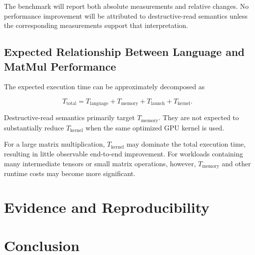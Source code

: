\documentclass[a4paper]{article}
\begin{document}
The benchmark will report both absolute measurements and relative changes. No performance improvement will be attributed to destructive-read semantics unless the corresponding measurements support that interpretation.



\subsection{Expected Relationship Between Language and MatMul Performance}

The expected execution time can be approximately decomposed as

\begin{equation}
T_{\mathrm{total}} =
T_{\mathrm{language}} +
T_{\mathrm{memory}} +
T_{\mathrm{launch}} +
T_{\mathrm{kernel}}.
\end{equation}

Destructive-read semantics primarily target $T_{\mathrm{memory}}$. They are not expected to substantially reduce $T_{\mathrm{kernel}}$ when the same optimized GPU kernel is used.

For a large matrix multiplication, $T_{\mathrm{kernel}}$ may dominate the total execution time, resulting in little observable end-to-end improvement. For workloads containing many intermediate tensors or small matrix operations, however, $T_{\mathrm{memory}}$ and other runtime costs may become more significant. 




\section{Evidence and Reproducibility}
\label{sec:evidence}



\section{Conclusion}

\end{document}
